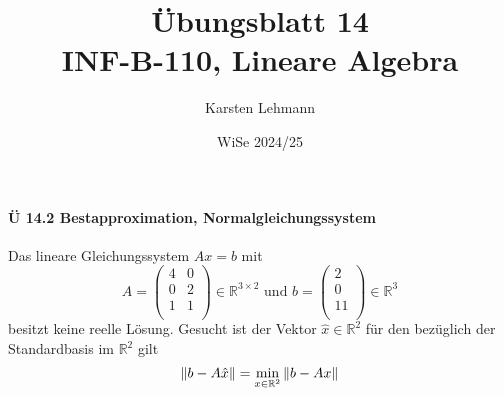 \documentclass{scrreprt}
\author{Karsten Lehmann}
\date{WiSe 2024/25}
\title{Übungsblatt 14\\INF-B-110, Lineare Algebra}
\begin{document}
\paragraph{Ü 14.2 Bestapproximation, Normalgleichungssystem}

Das lineare Gleichungssystem $Ax = b$ mit
\[
  A = \begin{pmatrix}
    4 & 0 \\
    0 & 2 \\
    1 & 1 \\
  \end{pmatrix} \in \mathbb{R}^{3 \times 2}
  \text{ und }
  b = \begin{pmatrix}
    2  \\
    0  \\
    11 \\
  \end{pmatrix} \in \mathbb{R}^3
\]
besitzt keine reelle Lösung.
Gesucht ist der Vektor $\hat{x} \in \mathbb{R}^2$ für den bezüglich der
Standardbasis im $\mathbb{R}^2$ gilt
\[
  \norm{b - A\hat{x}} = \min_{x \in \mathbb{R}^2}\norm{b - Ax}
\]
\end{document}
